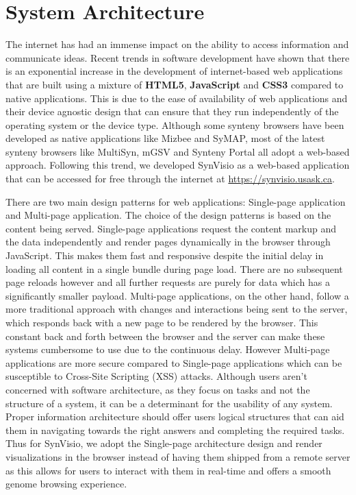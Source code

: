\section{System Architecture}

The internet has had an immense impact on the ability to access information and communicate ideas. Recent trends in software development have shown that there is an exponential increase in the development of internet-based web applications that are built using a mixture of \textbf{HTML5}, \textbf{JavaScript} and \textbf{CSS3} compared to native applications.
This is due to the ease of availability of web applications and their device agnostic design that can ensure that they run independently of the operating system or the device type. Although some synteny browsers have been developed as native applications like Mizbee and SyMAP\cite{Meyer2009,soderlund2011symap}, most of the latest synteny browsers like MultiSyn, mGSV and Synteny Portal\cite{baek2016multisyn,revanna2011gsv,lee2016syntenyportal} all adopt a web-based approach. Following this trend, we developed SynVisio as a web-based application that can be accessed for free through the internet at \url{https://synvisio.usask.ca}.

There are two main design patterns for web applications: Single-page application and Multi-page application. The choice of the design patterns is based on the content being served. Single-page applications request the content markup and the data independently and render pages dynamically in the browser through JavaScript. This makes them fast and responsive despite the initial delay in loading all content in a single bundle during page load. There are no subsequent page reloads however and all further requests are purely for data which has a significantly smaller payload. Multi-page applications, on the other hand, follow a more traditional approach with changes and interactions being sent to the server, which responds back with a new page to be rendered by the browser. This constant back and forth between the browser and the server can make these systems cumbersome to use due to the continuous delay. However Multi-page applications are more secure compared to Single-page applications which can be susceptible to Cross-Site Scripting (XSS) attacks.
Although users aren't concerned with software architecture, as they focus on tasks and not the structure of a system, it can be a determinant for the usability of any system. Proper information architecture should offer users logical structures that can aid them in navigating towards the right answers and completing the required tasks\cite{rosenfeld2002information}. Thus for SynVisio, we adopt the Single-page architecture design and render visualizations in the browser instead of having them shipped from a remote server as this allows for users to interact with them in real-time and offers a smooth genome browsing experience\cite{nielsen2010visualizing}. 

